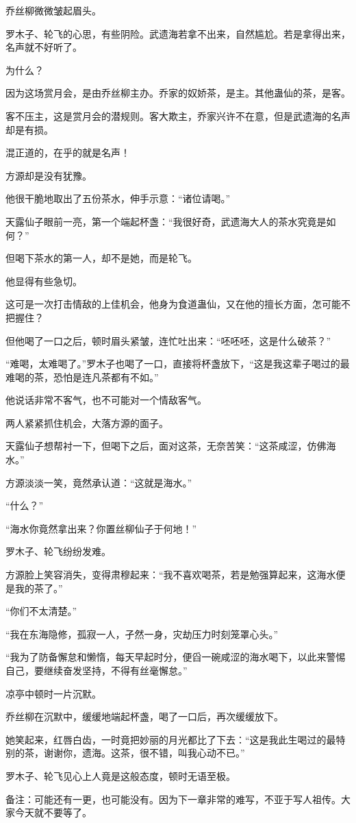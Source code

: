 \begin{this_body}
乔丝柳微微皱起眉头。

罗木子、轮飞的心思，有些阴险。武遗海若拿不出来，自然尴尬。若是拿得出来，名声就不好听了。

为什么？

因为这场赏月会，是由乔丝柳主办。乔家的奴娇茶，是主。其他蛊仙的茶，是客。

客不压主，这是赏月会的潜规则。客大欺主，乔家兴许不在意，但是武遗海的名声却是有损。

混正道的，在乎的就是名声！

方源却是没有犹豫。

他很干脆地取出了五份茶水，伸手示意：“诸位请喝。”

天露仙子眼前一亮，第一个端起杯盏：“我很好奇，武遗海大人的茶水究竟是如何？”

但喝下茶水的第一人，却不是她，而是轮飞。

他显得有些急切。

这可是一次打击情敌的上佳机会，他身为食道蛊仙，又在他的擅长方面，怎可能不把握住？

但他喝了一口之后，顿时眉头紧皱，连忙吐出来：“呸呸呸，这是什么破茶？”

“难喝，太难喝了。”罗木子也喝了一口，直接将杯盏放下，“这是我这辈子喝过的最难喝的茶，恐怕是连凡茶都有不如。”

他说话非常不客气，也不可能对一个情敌客气。

两人紧紧抓住机会，大落方源的面子。

天露仙子想帮衬一下，但喝下之后，面对这茶，无奈苦笑：“这茶咸涩，仿佛海水。”

方源淡淡一笑，竟然承认道：“这就是海水。”

“什么？”

“海水你竟然拿出来？你置丝柳仙子于何地！”

罗木子、轮飞纷纷发难。

方源脸上笑容消失，变得肃穆起来：“我不喜欢喝茶，若是勉强算起来，这海水便是我的茶了。”

“你们不太清楚。”

“我在东海隐修，孤寂一人，孑然一身，灾劫压力时刻笼罩心头。”

“我为了防备懈怠和懒惰，每天早起时分，便舀一碗咸涩的海水喝下，以此来警惕自己，要继续奋发坚持，不得有丝毫懈怠。”

凉亭中顿时一片沉默。

乔丝柳在沉默中，缓缓地端起杯盏，喝了一口后，再次缓缓放下。

她笑起来，红唇白齿，一时竟把妙丽的月光都比了下去：“这是我此生喝过的最特别的茶，谢谢你，遗海。这茶，很不错，叫我心动不已。”

罗木子、轮飞见心上人竟是这般态度，顿时无语至极。

备注：可能还有一更，也可能没有。因为下一章非常的难写，不亚于写人祖传。大家今天就不要等了。

\end{this_body}

